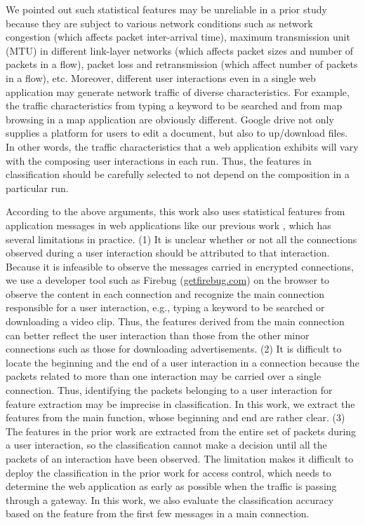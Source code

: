 \documentclass[preprint,12pt]{elsarticle}
\begin{document}
We pointed out such statistical features may be unreliable in a prior study \cite{TFT14} because they are subject to various network conditions such as network congestion (which affects packet inter-arrival time), maximum transmission unit (MTU) in different link-layer networks (which affects packet sizes and number of packets in a flow), packet loss and retransmission (which affect number of packets in a flow), etc. Moreover, different user interactions even in a single web application may generate network traffic of diverse characteristics. For example, the traffic characteristics from typing a keyword to be searched and from map browsing in a map application are obviously different. Google drive not only supplies a platform for users to edit a document, but also to up/download files. In other words, the traffic characteristics that a web application exhibits will vary with the composing user interactions in each run. Thus, the features in classification should be carefully selected to not depend on the composition in a particular run.
   
According to the above arguments, this work also uses statistical features from application messages in web applications like our previous work \cite{TFT14}, which has several limitations in practice. (1) It is unclear whether or not all the connections observed during a user interaction should be attributed to that interaction. Because it is infeasible to observe the messages carried in encrypted connections, we use a developer tool such as Firebug (\url{getfirebug.com}) on the browser to observe the content in each connection and recognize the main connection responsible for a user interaction, e.g., typing a keyword to be searched or downloading a video clip. Thus, the features derived from the main connection can better reflect the user interaction than those from the other minor connections such as those for downloading advertisements. (2) It is difficult to locate the beginning and the end of a user interaction in a connection because the packets related to more than one interaction may be carried over a single connection. Thus, identifying the packets belonging to a user interaction for feature extraction may be imprecise in classification. In this work, we extract the features from the main function, whose beginning and end are rather clear. (3) The features in the prior work are extracted from the entire set of packets during a user interaction, so the classification cannot make a decision until all the packets of an interaction have been observed. The limitation makes it difficult to deploy the classification in the prior work for access control, which needs to determine the web application as early as possible when the traffic is passing through a gateway. In this work, we also evaluate the classification accuracy based on the feature from the first few messages in a main connection. 
\end{document}
